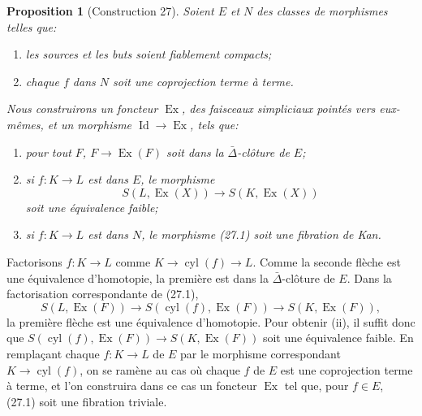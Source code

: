 \documentclass[11pt]{article}
\theoremstyle{deligne}
\newtheorem*{proposition*}{Proposition}
\newcommand{\Ex}{\operatorname{Ex}}
\newcommand{\Id}{\operatorname{Id}}
\newcommand{\cyl}{\operatorname{cyl}}
\begin{document}
\begin{proposition*}[Construction 27]
Soient \(E\) et \(N\) des classes de morphismes telles que:
\begin{enumerate}[label=(\alph*)]
\item les sources et les buts soient fiablement compacts;
\item chaque \(f\) dans \(N\) soit une coprojection terme à terme.
\end{enumerate}
Nous construirons un foncteur \(\Ex\), des faisceaux simpliciaux pointés vers eux-mêmes, et un morphisme \(\Id\to\Ex\), tels que:
\begin{enumerate}[label=(\roman*)]
\item pour tout \(F\), \(F\to\Ex(F)\) soit dans la \(\bar\Delta\)-clôture de \(E\);
\item si \(f:K\to L\) est dans \(E\), le morphisme
\[
S(L,\Ex(X))\longrightarrow S(K,\Ex(X))
\tag{27.1}
\]
soit une équivalence faible;
\item si \(f:K\to L\) est dans \(N\), le morphisme (27.1) soit une fibration de Kan.
\end{enumerate}
\end{proposition*}

Factorisons \(f:K\to L\) comme \(K\to \cyl(f)\to L\). Comme la seconde flèche est une équivalence d'homotopie, la première est dans la \(\bar\Delta\)-clôture de \(E\). Dans la factorisation correspondante de (27.1),
\[
S(L,\Ex(F))\to S(\cyl(f),\Ex(F))\to S(K,\Ex(F)),
\]
la première flèche est une équivalence d'homotopie. Pour obtenir (ii), il suffit donc que \(S(\cyl(f),\Ex(F))\to S(K,\Ex(F))\) soit une équivalence faible. En remplaçant chaque \(f:K\to L\) de \(E\) par le morphisme correspondant \(K\to\cyl(f)\), on se ramène au cas où chaque \(f\) de \(E\) est une coprojection terme à terme, et l'on construira dans ce cas un foncteur \(\Ex\) tel que, pour \(f\in E\), (27.1) soit une fibration triviale.
\end{document}
